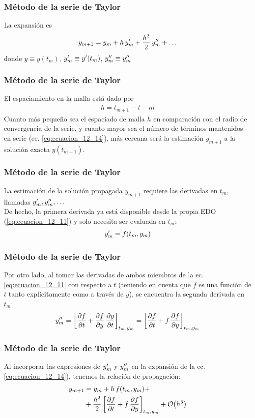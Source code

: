 \begin{frame}
\frametitle{Método de la serie de Taylor}
La expansión es
\begin{align}
y_{m+1} = y_{m} + h \, {y}^{\prime}_{m} + \dfrac{h^{2}}{2} \, {y}^{\prime \prime}_{m} + \ldots
\label{eq:ecuacion_12_14}
\end{align}
donde $y \equiv y(t_{m})$, ${y}^{\prime}_{m} \equiv {y}^{\prime} (t_{m})$, ${y}^{\prime \prime}_{m} \equiv {y}^{\prime \prime}_{m}$ 
\end{frame}
\begin{frame}
\frametitle{Método de la serie de Taylor}
El espaciamiento en la malla está dado por
\begin{align*}
h = t_{m+1} - t-{m}
\end{align*}
Cuanto más pequeño sea el espaciado de malla $h$ en comparación con el radio de convergencia de la serie, y cuanto mayor sea el número de términos mantenidos en serie (ec. \ref{eq:ecuacion_12_14}), más cercana será la estimación $y_{m + 1}$ a la solución exacta $y(t_{m + 1})$.
\end{frame}
\begin{frame}
\frametitle{Método de la serie de Taylor}
La estimación de la solución propagada $y_{m + 1}$ requiere las derivadas en $t_{m}$, llamadas ${y}^{\prime}_{m}, {y}^{\prime \prime}_{m}, \ldots$
\\
\bigskip
De hecho, la primera derivada ya está disponible desde la propia EDO (\ref{eq:ecuacion_12_11}) y solo necesita ser evaluada en $t_{m}$:
\begin{align*}
{y}^{\prime}_{m} = f( t_{m}, y_{m})
\end{align*}
\end{frame}
\begin{frame}
\frametitle{Método de la serie de Taylor}
Por otro lado, al tomar las derivadas de ambos miembros de la ec. \ref{eq:ecuacion_12_11} con respecto a $t$ (teniendo en cuenta que $f$ es una función de $t$ tanto explícitamente como a través de $y$), se encuentra la segunda derivada en $t_{m}$:
\begin{align*}
{y}^{\prime \prime}_{m} = \left[ \pdv{f}{t} + \pdv{f}{y} \, \pdv{y}{t} \right]_{t_{m}, y_{m}} = \left[ \pdv{f}{t} + f \, \pdv{f}{y} \right]_{t_{m}, y_{m}}
\end{align*}
\end{frame}
\begin{frame}
\frametitle{Método de la serie de Taylor}
Al incorporar las expresiones de ${y}^{\prime}_{m}$ y ${y}^{\prime \prime}_{m}$ en la expansión de la ec. \ref{eq:ecuacion_12_14}), tenemos la relación de propagación:
\begin{align}
\begin{aligned}
y_{m+1} &= y_{m} + h \, f(t_{m}, y_{m}) + \\
&+ \dfrac{h^{2}}{2} \left[\pdv{f}{t} + f \, \pdv{f}{y} \right]_{t_{m}, y_{m}} + \order{h^{3}}
\end{aligned}
\label{eq:ecuacion_12_15}
\end{align}
\end{frame}
